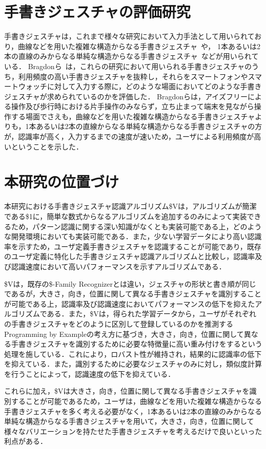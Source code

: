 \section{手書きジェスチャの評価研究}
手書きジェスチャは，これまで様々な研究において入力手法として用いられており，曲線などを用いた複雑な構造からなる手書きジェスチャ~\cite{Lu:2011:GAT:1978942.1978972,Li:2010:GST:1866029.1866044,Moran:1997:PIT:263407.263508,Hinckley:2007:ISS:1240624.1240666,Appert:2009:USC:1518701.1519052,Liao:2008:PGC:1314683.1314686,Zeleznik:2008:LCD:1449715.1449741}や，
1本あるいは2本の直線のみからなる単純な構造からなる手書きジェスチャ~\cite{Kurtenbach:1993:LEP:164632.164977}などが用いられている．
Bragdonら~\cite{Bragdon:2011:EAT:1978942.1979000}は，これらの研究において用いられる手書きジェスチャのうち，利用頻度の高い手書きジェスチャを抜粋し，それらをスマートフォンやスマートウォッチに対して入力する際に，どのような場面においてどのような手書きジェスチャが求められているのかを評価した．
Bragdonらは，アイズフリーによる操作及び歩行時における片手操作のみならず，立ち止まって端末を見ながら操作する場面でさえも，曲線などを用いた複雑な構造からなる手書きジェスチャよりも，1本あるいは2本の直線からなる単純な構造からなる手書きジェスチャの方が，認識率が高く，入力するまでの速度が速いため，ユーザによる利用頻度が高いということを示した．

\section{本研究の位置づけ}
本研究における手書きジェスチャ認識アルゴリズム\$Vは，アルゴリズムが簡潔である\$1に，簡単な数式からなるアルゴリズムを追加するのみによって実装できるため，パターン認識に関する深い知識がなくとも実装可能である上，どのような開発環境においても実装可能である．また，少ない学習データにより高い認識率を示すため，ユーザ定義手書きジェスチャを認識することが可能であり，既存のユーザ定義に特化した手書きジェスチャ認識アルゴリズムと比較し，認識率及び認識速度において高いパフォーマンスを示すアルゴリズムである．

\$Vは，既存の\$-Family Recognizerとは違い，ジェスチャの形状と書き順が同じであるが，大きさ，向き，位置に関して異なる手書きジェスチャを識別することが可能である上，認識率及び認識速度においてパフォーマンスの低下を抑えたアルゴリズムである．また，\$Vは，得られた学習データから，ユーザがそれぞれの手書きジェスチャをどのように区別して登録しているのかを推測するProgramming by Exampleの考え方に基づき，大きさ，向き，位置に関して異なる手書きジェスチャを識別するために必要な特徴量に高い重み付けをするという処理を施している．これにより，ロバスト性が維持され，結果的に認識率の低下を抑えている．また，識別するために必要なジェスチャのみに対し，類似度計算を行うことによって，認識速度の低下を抑えている．

これらに加え，\$Vは大きさ，向き，位置に関して異なる手書きジェスチャを識別することが可能であるため，ユーザは，曲線などを用いた複雑な構造からなる手書きジェスチャを多く考える必要がなく，1本あるいは2本の直線のみからなる単純な構造からなる手書きジェスチャを用いて，大きさ，向き，位置に関して様々なバリエーションを持たせた手書きジェスチャを考えるだけで良いといった利点がある．






